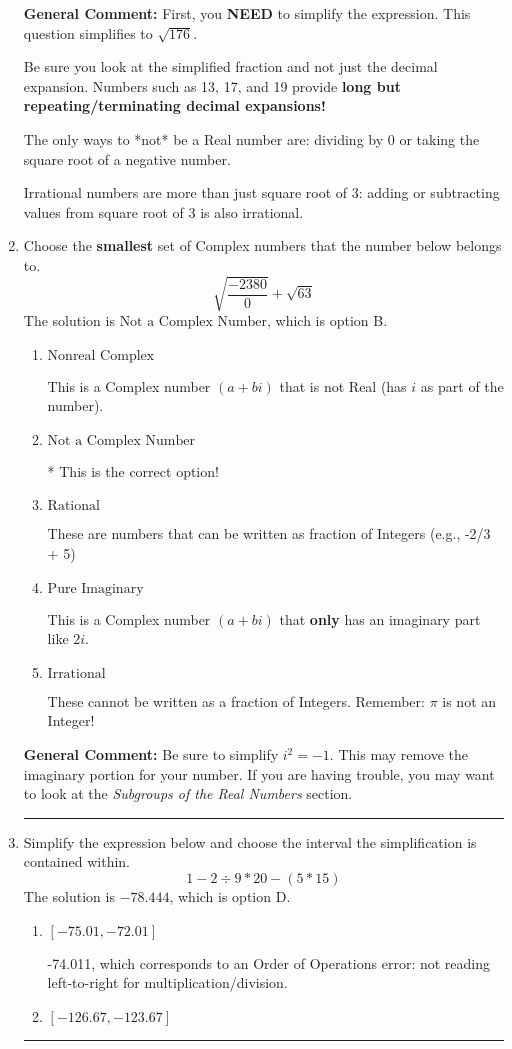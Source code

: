 \documentclass{extbook}[14pt]
\newcommand{\litem}[1]{\item #1

\rule{\textwidth}{0.4pt}}
\begin{document}
\begin{enumerate}
{\textbf{General Comment:} First, you \textbf{NEED} to simplify the expression. This question simplifies to $\sqrt{176}$. 
 
 Be sure you look at the simplified fraction and not just the decimal expansion. Numbers such as 13, 17, and 19 provide \textbf{long but repeating/terminating decimal expansions!} 
 
 The only ways to *not* be a Real number are: dividing by 0 or taking the square root of a negative number. 
 
 Irrational numbers are more than just square root of 3: adding or subtracting values from square root of 3 is also irrational.
}
\litem{
Choose the \textbf{smallest} set of Complex numbers that the number below belongs to.
\[ \sqrt{\frac{-2380}{0}}+\sqrt{63} \]The solution is \( \text{Not a Complex Number} \), which is option B.\begin{enumerate}[label=\Alph*.]
\item \( \text{Nonreal Complex} \)

This is a Complex number $(a+bi)$ that is not Real (has $i$ as part of the number).
\item \( \text{Not a Complex Number} \)

* This is the correct option!
\item \( \text{Rational} \)

These are numbers that can be written as fraction of Integers (e.g., -2/3 + 5)
\item \( \text{Pure Imaginary} \)

This is a Complex number $(a+bi)$ that \textbf{only} has an imaginary part like $2i$.
\item \( \text{Irrational} \)

These cannot be written as a fraction of Integers. Remember: $\pi$ is not an Integer!
\end{enumerate}

\textbf{General Comment:} Be sure to simplify $i^2 = -1$. This may remove the imaginary portion for your number. If you are having trouble, you may want to look at the \textit{Subgroups of the Real Numbers} section.
}
\litem{
Simplify the expression below and choose the interval the simplification is contained within.
\[ 1 - 2 \div 9 * 20 - (5 * 15) \]The solution is \( -78.444 \), which is option D.\begin{enumerate}[label=\Alph*.]
\item \( [-75.01, -72.01] \)

 -74.011, which corresponds to an Order of Operations error: not reading left-to-right for multiplication/division.
\item \( [-126.67, -123.67] \)


\end{enumerate}}
\end{enumerate}
\end{document}
